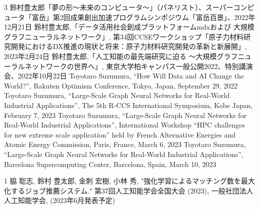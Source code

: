 \begin{招待講演}{3}
 鈴村豊太郎「夢の形～未来のコンピュータ～」（パネリスト）、スーパーコンピュータ「富岳」第2回成果創出加速プログラムシンポジウム「富岳百景」、2022年12月21日
鈴村豊太郎,「データ活用社会創成プラットフォームmdxおよび 大規模グラフニューラルネットワーク」, 第34回CCSEワークショップ「原子力材料研究開発におけるDX推進の現状と将来：原子力材料研究開発の革新と新展開」, 2023年2月24日
鈴村豊太郎,「人工知能の最先端研究に迫る ～大規模グラフニューラルネットワークの世界へ」, 東京大学柏キャンパス一般公開2022、特別講演会、2022年10月22日
Toyotaro Suzumura, “How Will Data and AI Change the World?”,  Rakuten Optimism Conference, Tokyo, Japan, September 29, 2022
Toyotaro Suzumura,  “Large-Scale Graph Neural Networks for Real-World Industrial Applications”, The 5th R-CCS International Symposium, Kobe Japan, February 7, 2023
Toyotaro Suzumura,  “Large-Scale Graph Neural Networks for Real-World Industrial Applications”, International Workshop “HPC challenges for new extreme scale application” held by French Alternative Energies and Atomic Energy Commission, Paris, France, March 6, 2023
Toyotaro Suzumura,  “Large-Scale Graph Neural Networks for Real-World Industrial Applications”, Barcelona Supercomputing Center, Barcelona, Spain, March 10, 2023
\end{招待講演}



\begin{発表}{1}
脇 聡志, 鈴村 豊太郎, 金刺 宏樹, 小林 秀, "強化学習によるマッチング数を最大化するジョブ推薦システム." 第37回人工知能学会全国大会 (2023),  一般社団法人 人工知能学会, (2023年6月発表予定)

\end{発表}



